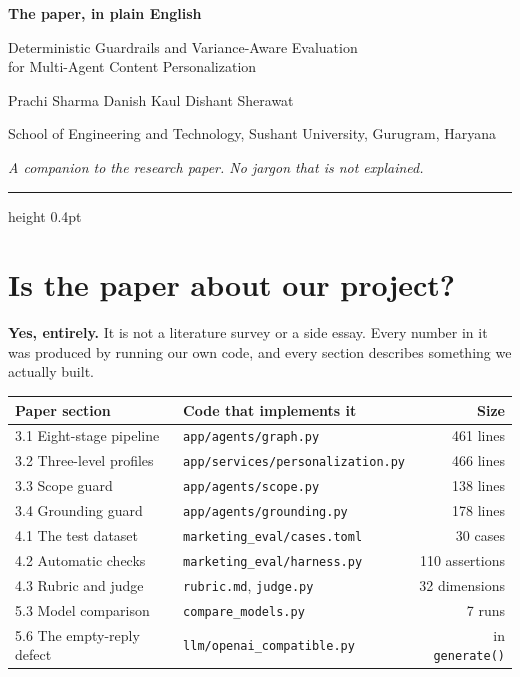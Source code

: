 \documentclass[11pt]{article}
\begin{document}
\begin{center}
{\LARGE\bfseries The paper, in plain English\par}
\vspace{5pt}
{\large Deterministic Guardrails and Variance-Aware Evaluation\\
for Multi-Agent Content Personalization\par}
\vspace{8pt}
{\normalsize Prachi Sharma \quad Danish Kaul \quad Dishant Sherawat\par}
{\footnotesize School of Engineering and Technology, Sushant University,
Gurugram, Haryana\par}
\vspace{6pt}
{\footnotesize\itshape A companion to the research paper. No jargon that
is not explained.\par}
\end{center}

\vspace{6pt}
\hrule height 0.4pt
\vspace{4pt}

\section{Is the paper about our project?}

\textbf{Yes, entirely.} It is not a literature survey or a side essay. Every
number in it was produced by running our own code, and every section describes
something we actually built.

\begin{center}
\small
\begin{tabular}{@{}llr@{}}
\toprule
Paper section & Code that implements it & Size\\
\midrule
3.1 Eight-stage pipeline   & \texttt{app/agents/graph.py} & 461 lines\\
3.2 Three-level profiles   & \texttt{app/services/personalization.py} & 466 lines\\
3.3 Scope guard            & \texttt{app/agents/scope.py} & 138 lines\\
3.4 Grounding guard        & \texttt{app/agents/grounding.py} & 178 lines\\
4.1 The test dataset       & \texttt{marketing\_eval/cases.toml} & 30 cases\\
4.2 Automatic checks       & \texttt{marketing\_eval/harness.py} & 110 assertions\\
4.3 Rubric and judge       & \texttt{rubric.md}, \texttt{judge.py} & 32 dimensions\\
5.3 Model comparison       & \texttt{compare\_models.py} & 7 runs\\
5.6 The empty-reply defect & \texttt{llm/openai\_compatible.py} & in \texttt{generate()}\\
\bottomrule
\end{tabular}
\end{center}
\end{document}
